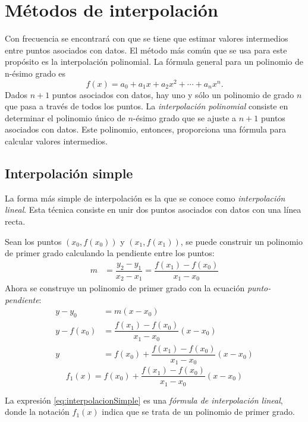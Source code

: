 \chapter{Métodos de interpolación}
Con frecuencia se encontrará con que se tiene que estimar valores intermedios entre puntos asociados con datos. El método más común que se usa 
para este propósito es la interpolación polinomial. La fórmula general para un polinomio de n-ésimo grado es
\begin{equation}
	f(x) = a_0 + a_1x + a_2x^2 + \cdots + a_nx^n.
	\label{eq:polinomioInterpolacion}
\end{equation}
Dados $n+1$ puntos asociados con datos, hay uno y sólo un polinomio de grado $n$ que pasa a través de todos los puntos. La 
\textit{interpolación polinomial} consiste en determinar el polinomio único de $n$-ésimo grado que se ajuste a $n+1$ puntos asociados con datos. 
Este polinomio, entonces, proporciona una fórmula para calcular valores intermedios.

\section{Interpolación simple}
La forma más simple de interpolación es la que se conoce como \textit{interpolación lineal}. Esta técnica consiste en unir dos puntos asociados 
con datos con una línea recta. 

Sean los puntos $(x_0,f(x_0))$ y $(x_1,f(x_1))$, se puede construir un polinomio de primer grado calculando la pendiente entre los puntos:
\begin{align*}
	m &= \dfrac{y_2-y_1}{x_2-x_1} = \dfrac{f(x_1)-f(x_0)}{x_1-x_0}
\end{align*}
Ahora se construye un polinomio de primer grado con la ecuación \textit{punto-pendiente}:
\begin{align*}
	y-y_0 &= m(x-x_0)\\
	y-f(x_0) &= \dfrac{f(x_1)-f(x_0)}{x_1-x_0}(x-x_0)\\
	y &= f(x_0) + \dfrac{f(x_1)-f(x_0)}{x_1-x_0}(x-x_0)
\end{align*}
\begin{equation}
	f_1(x) = f(x_0) + \dfrac{f(x_1)-f(x_0)}{x_1-x_0}(x-x_0)
	\label{eq:interpolacionSimple}
\end{equation}

La expresión \ref{eq:interpolacionSimple} es una \textit{fórmula de interpolación lineal}, donde la notación $f_1(x)$ indica que se trata de 
un polinomio de primer grado.

